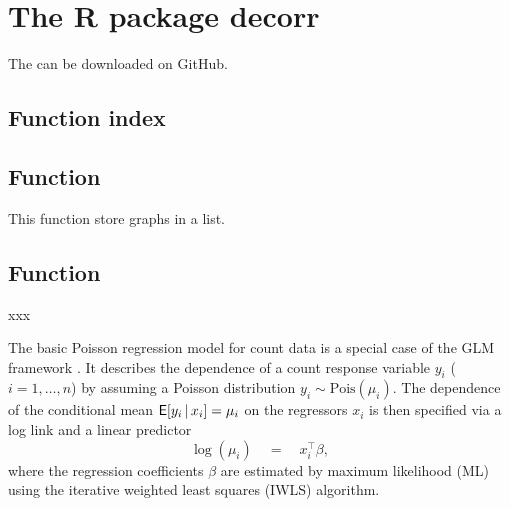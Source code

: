 \documentclass[article]{jss}
\begin{document}


\section{The R package decorr} \label{sec:models}

The  can be downloaded on GitHub.


\subsection{Function index} \label{sec:funct_index}

\subsection{Function } \label{sec:funct_list_dec}

This function store graphs in a list.

\subsection{Function } \label{sec:funct_etc}

xxx


The basic Poisson regression model for count data is a special case of the GLM
framework \cite{McCullagh+Nelder:1989}. It describes the dependence of a count
response variable $y_i$ ($i = 1, \dots, n$) by assuming a Poisson distribution
$y_i \sim \mathrm{Pois}(\mu_i)$. The dependence of the conditional mean
$\mathsf{E}[y_i \, | \, x_i] = \mu_i$ on the regressors $x_i$ is then specified via a
log link and a linear predictor
%
\begin{equation} \label{eq:mean}
\log(\mu_i) \quad = \quad x_i^\top \beta,
\end{equation}
%
where the regression coefficients $\beta$ are estimated by maximum likelihood
(ML) using the iterative weighted least squares (IWLS) algorithm.
\end{document}
